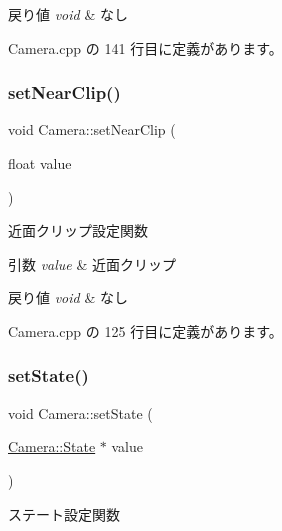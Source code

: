 \begin{DoxyRetVals}{戻り値}
{\em void} & なし \\
\hline
\end{DoxyRetVals}


 Camera.\+cpp の 141 行目に定義があります。

\mbox{\label{class_camera_a911ec8ed518a107fec11766b97d6d025}} 
\subsubsection{\texorpdfstring{set\+Near\+Clip()}{setNearClip()}}
{\footnotesize\ttfamily void Camera\+::set\+Near\+Clip (\begin{DoxyParamCaption}\item[{float}]{value }\end{DoxyParamCaption})}



近面クリップ設定関数 


\begin{DoxyParams}{引数}
{\em value} & 近面クリップ \\
\hline
\end{DoxyParams}

\begin{DoxyRetVals}{戻り値}
{\em void} & なし \\
\hline
\end{DoxyRetVals}


 Camera.\+cpp の 125 行目に定義があります。

\mbox{\label{class_camera_aedfc18fafa8a97eafbd8a2cb24c2e41b}} 
\subsubsection{\texorpdfstring{set\+State()}{setState()}}
{\footnotesize\ttfamily void Camera\+::set\+State (\begin{DoxyParamCaption}\item[{\mbox{\hyperlink{class_camera_1_1_state}{Camera\+::\+State}} $\ast$}]{value }\end{DoxyParamCaption})}



ステート設定関数 


